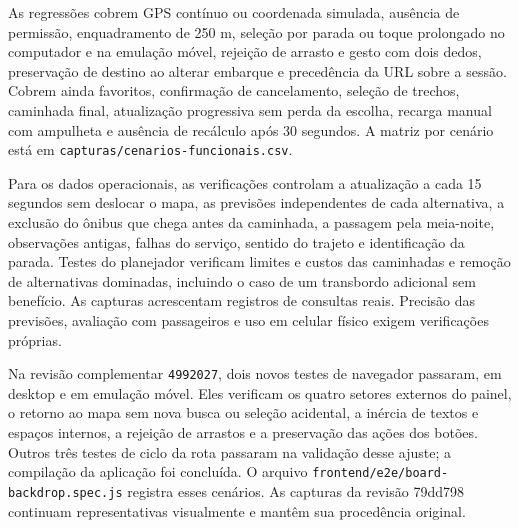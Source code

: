 \documentclass[12pt,oneside,a4paper,brazil,chapter=TITLE]{abntex2}
\begin{document}
\begin{apendicesenv}
As regressões cobrem GPS contínuo ou coordenada simulada, ausência de permissão, enquadramento de 250 m, seleção por parada ou toque prolongado no computador e na emulação móvel, rejeição de arrasto e gesto com dois dedos, preservação de destino ao alterar embarque e precedência da URL sobre a sessão. Cobrem ainda favoritos, confirmação de cancelamento, seleção de trechos, caminhada final, atualização progressiva sem perda da escolha, recarga manual com ampulheta e ausência de recálculo após 30 segundos. A matriz por cenário está em \nolinkurl{capturas/cenarios-funcionais.csv}.

Para os dados operacionais, as verificações controlam a atualização a cada 15 segundos sem deslocar o mapa, as previsões independentes de cada alternativa, a exclusão do ônibus que chega antes da caminhada, a passagem pela meia-noite, observações antigas, falhas do serviço, sentido do trajeto e identificação da parada. Testes do planejador verificam limites e custos das caminhadas e remoção de alternativas dominadas, incluindo o caso de um transbordo adicional sem benefício. As capturas acrescentam registros de consultas reais. Precisão das previsões, avaliação com passageiros e uso em celular físico exigem verificações próprias.

Na revisão complementar \texttt{4992027}, dois novos testes de navegador passaram, em desktop e em emulação móvel. Eles verificam os quatro setores externos do painel, o retorno ao mapa sem nova busca ou seleção acidental, a inércia de textos e espaços internos, a rejeição de arrastos e a preservação das ações dos botões. Outros três testes de ciclo da rota passaram na validação desse ajuste; a compilação da aplicação foi concluída. O arquivo \nolinkurl{frontend/e2e/board-backdrop.spec.js} registra esses cenários. As capturas da revisão 79dd798 continuam representativas visualmente e mantêm sua procedência original.





\end{apendicesenv}
\end{document}

